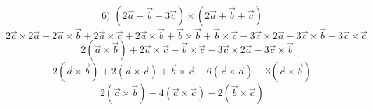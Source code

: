 \documentclass{article}
\begin{document}
\[ \text{6) } (2\vec{a} + \vec{b} - 3\vec{c}) \times (2\vec{a} + \vec{b} + \vec{c}) \]
\[ 2\vec{a} \times 2\vec{a} + 2\vec{a} \times \vec{b} + 2\vec{a} \times \vec{c} + 2\vec{a} \times \vec{b} + \vec{b} \times \vec{b} + \vec{b} \times \vec{c} - 3\vec{c} \times 2\vec{a} - 3\vec{c} \times \vec{b} - 3\vec{c} \times \vec{c} \]
\[ \quad 2(\vec{a} \times \vec{b}) + 2\vec{a} \times \vec{c} + \vec{b} \times \vec{c} - 3\vec{c} \times 2\vec{a} - 3\vec{c} \times \vec{b} \]
\[ 2(\vec{a} \times \vec{b}) + 2(\vec{a} \times \vec{c}) + \vec{b} \times \vec{c} - 6(\vec{c} \times \vec{a}) - 3(\vec{c} \times \vec{b}) \]
\[ 2(\vec{a} \times \vec{b}) - 4(\vec{a} \times \vec{c}) - 2(\vec{b} \times \vec{c}) \]
\end{document}
